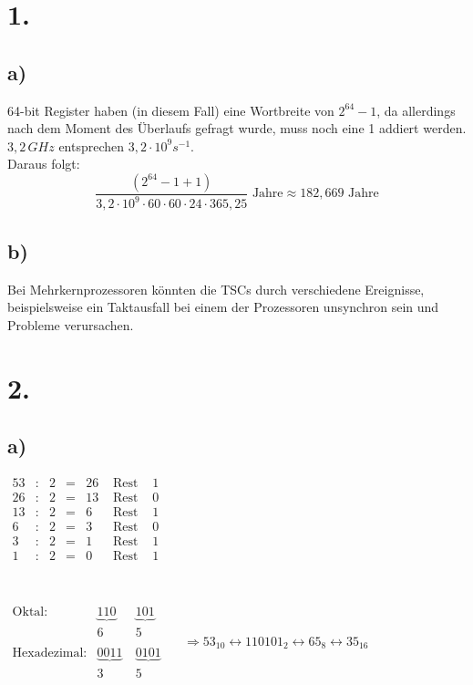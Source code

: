 \documentclass[a4paper]{scrartcl}
\title{\titleinfo}
\author{Tronje Krabbe 6435002, The-Vinh Jackie Huynh 6388888,\\Arne Struck 6326505}
\date{\today}
\begin{document}
\maketitle
\notag
\section{1.}
	\subsection{a)}
		64-bit Register haben (in diesem Fall) eine Wortbreite von \(2^{64}-1\), da allerdings nach 
			dem Moment des Überlaufs gefragt wurde, muss noch eine 1 addiert werden. \\
		\(3,2\, GHz\) entsprechen \(3,2\cdot 10^9s^{-1}\). \\
		Daraus folgt: \\
		\[
			\frac{(2^{64}-1+1)}{3,2\cdot 10^9 \cdot 60\cdot 60\cdot 24\cdot 365,25} 
			\text{ Jahre}\approx 182,669 \text{ Jahre}
		\]
	\subsection{b)}
		Bei Mehrkernprozessoren könnten die TSCs durch verschiedene Ereignisse, beispielsweise ein 
		Taktausfall bei einem der Prozessoren unsynchron sein und Probleme verursachen.
		
\section{2.}
	\subsection{a)}
		\(
		\begin{array}{rclclcc}
			53 &:& 2 &=& 26 &\text{ Rest } &1 \\
			26 &:& 2 &=& 13 &\text{ Rest } &0 \\
			13 &:& 2 &=& 6  &\text{ Rest } &1 \\
			6  &:& 2 &=& 3  &\text{ Rest } &0 \\
			3  &:& 2 &=& 1  &\text{ Rest } &1 \\
			1  &:& 2 &=& 0  &\text{ Rest } &1 \\	
		\end{array}
		\)\\ \\ \\
		\(
		\begin{array}{lcc}
			\text{Oktal:}&\underbrace{110}\ &\underbrace{101} \\
				&6&5 \\ \\
			\text{Hexadezimal:}&\underbrace{0011}\ &\underbrace{0101} \\
				&3&5
		\end{array}
		\)
		\(
			\quad\Rightarrow 53_{10} \leftrightarrow 110101_2 \leftrightarrow 65_8 \leftrightarrow 
			35_{16}
		\) \\
	
\end{document}
